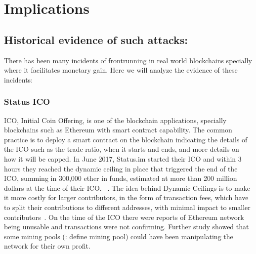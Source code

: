 
\section{Implications} %

\subsection{Historical evidence of such attacks:}\par\noindent
There has been many incidents of frontrunning in real world blockchains specially where it facilitates monetary gain. Here we will analyze the evidence of these incidents:


\subsubsection{Status ICO}
ICO, Initial Coin Offering, is one of the blockchain applications, specially blockchains such as Ethereum with smart contract capability. The common practice is to deploy a smart contract on the blockchain indicating the details of the ICO such as the trade ratio, when it starts and ends, and more details on how it will be capped.
In June 2017, Status.im started their ICO and within 3 hours they reached the dynamic ceiling in place that triggered the end of the ICO, summing in 300,000 ether in funds, estimated at more than 200 million dollars at the time of their ICO. ~\cite{statusicoanalysis}. The idea behind Dynamic Ceilings is to make it more costly for larger contributors,  in the form of transaction fees, which have to split their contributions to different addresses, with minimal impact to smaller contributors~\cite{statuswhitepaper}.
On the time of the ICO there were reports of Ethereum network being unusable and transactions were not confirming. Further study showed that some mining pools (\todo: define mining pool) could have been manipulating the network for their own profit.
 



